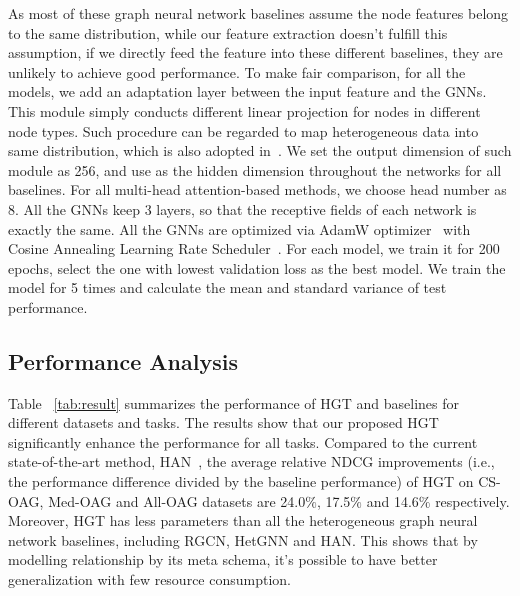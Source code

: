 \documentclass[sigconf]{acmart}
\theoremstyle{definition}
\begin{document}
{As most of these graph neural network baselines assume the node features belong to the same distribution, while our feature extraction doesn't fulfill this assumption, if we directly feed the feature into these different baselines, they are unlikely to achieve good performance. To make fair comparison, for all the models, we add an adaptation layer between the input feature and the GNNs. This module simply conducts different linear projection for nodes in different node types. Such procedure can be regarded to map heterogeneous data into same distribution, which is also adopted in~\cite{DBLP:conf/kdd/ZhangSHSC19, DBLP:conf/www/WangJSWYCY19}. We set the output dimension of such module as 256, and use as the hidden dimension throughout the networks for all baselines. For all multi-head attention-based methods, we choose head number as 8. All the GNNs keep 3 layers, so that the receptive fields of each network is exactly the same. All the GNNs are optimized via AdamW optimizer~\cite{DBLP:conf/iclr/LoshchilovH19} with Cosine Annealing Learning Rate Scheduler~\cite{DBLP:conf/iclr/LoshchilovH17}. For each model, we train it for 200 epochs, select the one with lowest validation loss as the best model. We train the model for 5 times and calculate the mean and standard variance of test performance. 


\subsection{Performance Analysis}

Table ~\ref{tab:result} summarizes the performance of HGT and baselines for different datasets and tasks. The results show that our proposed HGT significantly enhance the performance for all tasks. Compared to the current state-of-the-art method, HAN~\cite{DBLP:conf/www/WangJSWYCY19}, the average relative NDCG improvements (i.e., the performance difference  divided  by the baseline  performance) of HGT on CS-OAG, Med-OAG and All-OAG datasets are 24.0$\%$, 17.5$\%$ and 14.6$\%$ respectively. Moreover, HGT has less parameters than all the heterogeneous graph neural network baselines, including RGCN, HetGNN and HAN. This shows that by modelling relationship by its meta schema, it's possible to have better generalization with few resource consumption. 

}
\end{document}
